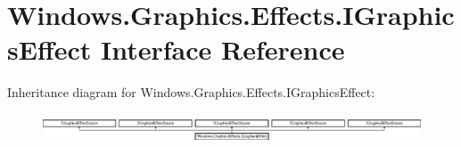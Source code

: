 \hypertarget{interface_windows_1_1_graphics_1_1_effects_1_1_i_graphics_effect}{}\section{Windows.\+Graphics.\+Effects.\+I\+Graphics\+Effect Interface Reference}
\label{interface_windows_1_1_graphics_1_1_effects_1_1_i_graphics_effect}
Inheritance diagram for Windows.\+Graphics.\+Effects.\+I\+Graphics\+Effect\+:\begin{figure}[H]
\begin{center}
\leavevmode
\includegraphics[height=0.864865cm]{interface_windows_1_1_graphics_1_1_effects_1_1_i_graphics_effect}
\end{center}
\end{figure}
